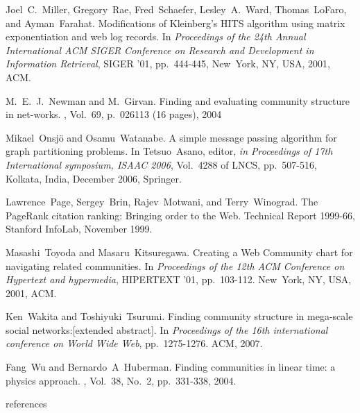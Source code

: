 \documentclass [a4j,11pt] {jsarticle}
\begin{document}
\begin{thebibliography}{10}
Joel~C.~Miller, Gregory~Rae, Fred~Schaefer, Lesley~A.~Ward, Thomas~LoFaro, and Ayman~Farahat.
\newblock Modifications of Kleinberg's HITS algorithm using matrix exponentiation and web log records.
\newblock In {\em Proceedings of the 24th Annual International ACM SIGER Conference on Research and Development in Information Retrieval},
\newblock SIGER '01, pp.~444-445, New~York, NY, USA, 2001, ACM.

M.~E.~J.~Newman and M.~Girvan.
\newblock Finding and evaluating community structure in net-works.
, Vol.~69, p.~026113 (16 pages), 2004

Mikael~Onsj\"o and Osamu~Watanabe.
\newblock A simple message passing algorithm for graph partitioning problems.
\newblock In Tetsuo~Asano, editor, {\em in Proceedings of 17th International symposium, ISAAC 2006}, Vol.~4288 of LNCS, pp.~507-516, Kolkata, India, December 2006, Springer.

Lawrence~Page, Sergey~Brin, Rajev~Motwani, and Terry~Winograd.
\newblock The PageRank citation ranking: Bringing order to the Web.
\newblock Technical Report 1999-66, Stanford InfoLab, November 1999.

Masashi~Toyoda and Masaru~Kitsuregawa.
\newblock Creating a Web Community chart for navigating related communities.
\newblock In {\em Proceedings of the 12th ACM Conference on Hypertext and hypermedia}, HIPERTEXT '01, pp.~103-112. New~York, NY, USA, 2001, ACM.

Ken~Wakita and Toshiyuki~Tsurumi.
\newblock Finding community structure in mega-scale social networks:[extended abstract].
\newblock In {\em Proceedings of the 16th international conference on World Wide Web}, pp.~1275-1276. ACM, 2007.

Fang~Wu and Bernardo~A~Huberman.
\newblock Finding communities in linear time: a physics approach.
, Vol.~38, No.~2, pp.~331-338, 2004.

\end {thebibliography}


 {references}
\end{document}
